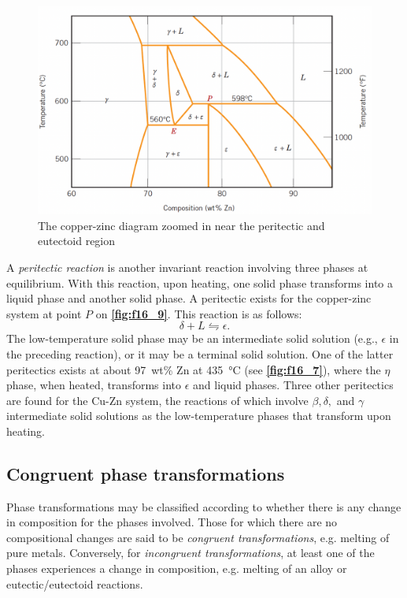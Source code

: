 \begin{figure} [ht]
  \centering
  \includegraphics[width=0.5\linewidth]{./figures/f16_9.png}
  \caption{The copper-zinc diagram zoomed in near the peritectic and eutectoid region}
  \label{fig:f16_9}
\end{figure}

A \textit{peritectic reaction} is another invariant reaction involving three phases at equilibrium. With this reaction, upon heating, one solid phase transforms into a liquid phase and another solid phase. A peritectic exists for the copper-zinc system at point $P$ on \textbf{\autoref{fig:f16_9}}. This reaction is as follows:
\[ 
\delta + L \leftrightharpoons \epsilon
.\]
The low-temperature solid phase may be an intermediate solid solution (e.g., $\epsilon$ in the preceding reaction), or it may be a terminal solid solution. One of the latter peritectics exists at about \qty{97}{wt}\% Zn at \qty{435}{\celsius} (see \textbf{\autoref{fig:f16_7}}), where the $\eta$ phase, when heated, transforms into $\epsilon$ and liquid phases. Three other peritectics are found for the Cu-Zn system, the reactions of which involve $\beta, \delta,$ and $\gamma$ intermediate solid solutions as the low-temperature phases that transform upon heating. 


\subsection{Congruent phase transformations}
Phase transformations may be classified according to whether there is any change in composition for the phases involved. Those for which there are no compositional changes are said to be \textit{congruent transformations}, e.g. melting of pure metals. Conversely, for \textit{incongruent transformations}, at least one of the phases experiences a change in composition, e.g. melting of an alloy or eutectic/eutectoid reactions.

